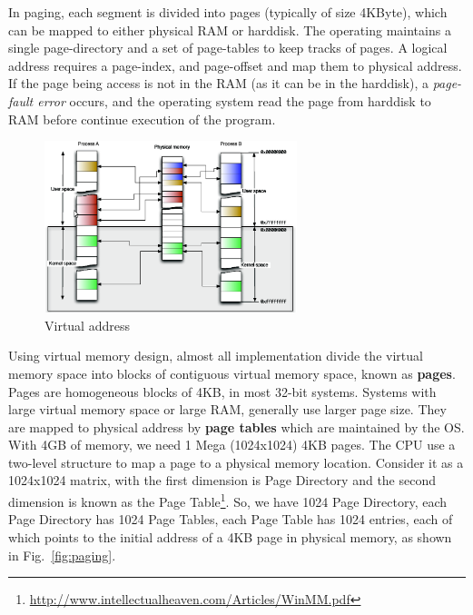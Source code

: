 In paging, each segment is divided into pages (typically of size 4KByte), which
can be mapped to either physical RAM or harddisk. The operating maintains a
single page-directory and a set of page-tables to keep tracks of pages. A
logical address requires a page-index, and page-offset and map them to physical
address. If the page being access is not in the RAM (as it can be in the
harddisk), a {\it page-fault error} occurs, and the operating system read the
page from harddisk to RAM before continue execution of the program. 





\begin{figure}[hbt]
  \centerline{\includegraphics[height=5cm,
    angle=0]{./images/virtual_address.eps}}
\caption{Virtual address}
\label{fig:virtual_address}
\end{figure}

Using virtual memory design, almost all implementation divide the
virtual memory space into blocks of contiguous virtual memory space,
known as {\bf pages}. Pages are homogeneous blocks of 4KB, in most
32-bit systems. Systems with large virtual memory space or large RAM,
generally use larger page size.  They are mapped to physical address
by {\bf page tables} which are maintained by the OS.  With 4GB of
memory, we need 1 Mega (1024x1024) 4KB pages. The CPU use a two-level
structure to map a page to a physical memory location. Consider it as
a 1024x1024 matrix, with the first dimension is Page Directory and the
second dimension is known as the Page
Table\footnote{\url{http://www.intellectualheaven.com/Articles/WinMM.pdf}}.
So, we have 1024 Page Directory, each Page Directory has 1024 Page
Tables, each Page Table has 1024 entries, each of which points to the
initial address of a 4KB page in physical memory, as shown in
Fig.~\ref{fig:paging}.

